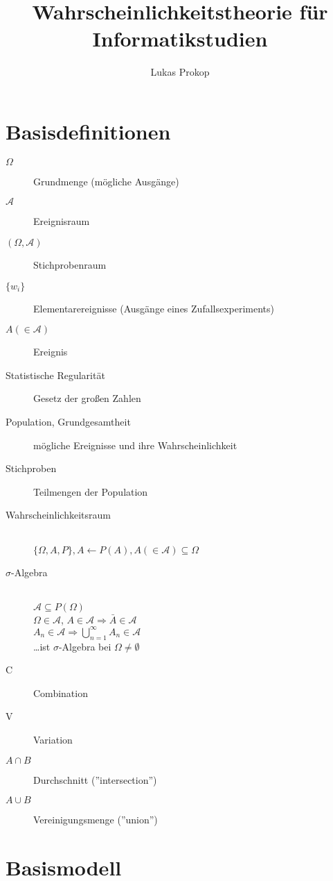 \documentclass[a4paper,twocolumn]{article}
\author{Lukas Prokop}
\title{Wahrscheinlichkeitstheorie für Informatikstudien}
\begin{document}
\maketitle

\section{Basisdefinitionen}

\begin{description}
  \item[$\Omega$] Grundmenge (mögliche Ausgänge)
  \item[$\mathcal{A}$] Ereignisraum
  \item[$(\Omega, \mathcal{A})$] Stichprobenraum
  \item[$\{w_i\}$] Elementarereignisse
    (Ausgänge eines Zufallsexperiments)
  \item[$A (\in \mathcal{A})$] Ereignis
  \item[Statistische Regularität] Gesetz der großen Zahlen
  \item[Population, Grundgesamtheit]
    mögliche Ereignisse und ihre Wahrscheinlichkeit
  \item[Stichproben] Teilmengen der Population
  \item[Wahrscheinlichkeitsraum] \hfill{} \\
    $\{\Omega, A, P\}, A \leftarrow P(A),
        A (\in \mathcal{A}) \subseteq \Omega$
  \item[$\sigma$-Algebra] \hfill{} \\
    $\mathcal{A} \subseteq P(\Omega)$ \\
    $\Omega \in \mathcal{A}$, $A \in \mathcal{A} \Rightarrow \bar{A} \in
    \mathcal{A}$ \\
    $A_n \in \mathcal{A} \Rightarrow \bigcup_{n=1}^\infty A_n \in
    \mathcal{A}$ \\
    \dots ist $\sigma$-Algebra bei $\Omega \neq \emptyset$
  \item[C] Combination
  \item[V] Variation
  \item[$A\cap B$] Durchschnitt (''intersection'')
  \item[$A\cup B$] Vereinigungsmenge (''union'')
\end{description}

\section{Basismodell}
\end{document}

